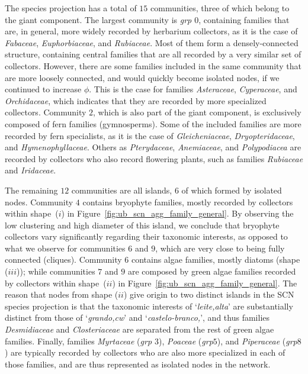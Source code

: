 The species projection has a total of $15$ communities, three of which belong to the giant component. 
%
The largest community is \textit{grp $0$}, containing families that are, in general, more widely recorded by herbarium collectors, as it is the case of \textit{Fabaceae}, \textit{Euphorbiaceae}, and \textit{Rubiaceae}.
Most of them form a densely-connected structure, containing central families that are all recorded by a very similar set of collectors.
However, there are some families included in the same community that are more loosely connected, and would quickly become isolated nodes, if we continued to increase $\phi$. 
This is the case for families \textit{Asteraceae}, \textit{Cyperaceae}, and \textit{Orchidaceae}, which indicates that they are recorded by more specialized collectors.
Community $2$, which is also part of the giant component, is exclusively composed of fern families (gymnosperms).
Some of the included families are more recorded by fern specialists, as it is the case of \textit{Gleicheniaceae}, \textit{Dryopteridaceae}, and \textit{Hymenophyllaceae}.
Others as \textit{Pterydaceae}, \textit{Anemiaceae}, and \textit{Polypodiacea} are recorded by collectors who also record flowering plants, such as families \textit{Rubiaceae} and \textit{Iridaceae}.


The remaining $12$ communities are all islands, $6$ of which formed by isolated nodes.
%
Community $4$ contains bryophyte families, mostly recorded by collectors within shape~($i$) in Figure~\ref{fig:ub_scn_agg_family_general}.
By observing the low clustering and high diameter of this island, we conclude that bryophyte collectors vary significantly regarding their taxonomic interests, as opposed to what we observe for communities $6$ and $9$, which are very close to being fully connected (cliques).
Community $6$ contains algae families, mostly diatoms (shape ($iii$));
%
while communities $7$ and $9$ are composed by green algae families recorded by collectors within shape~($ii$) in Figure~\ref{fig:ub_scn_agg_family_general}.
The reason that nodes from shape ($ii$) give origin to two distinct islands in the SCN species projection is that the taxonomic interests of `\textit{leite,alta}' are substantially distinct from those of `\textit{grando,cw}' and `\textit{castelo-branco,}', and thus families \textit{Desmidiaceae} and \textit{Closteriaceae} are separated from the rest of green algae families.
Finally, families \textit{Myrtaceae} (\textit{grp $3$}), \textit{Poaceae} (\textit{grp$5$}), and \textit{Piperaceae} (\textit{grp$8$}) are typically recorded by collectors who are also more specialized in each of those families, and are thus represented as isolated nodes in the network.


